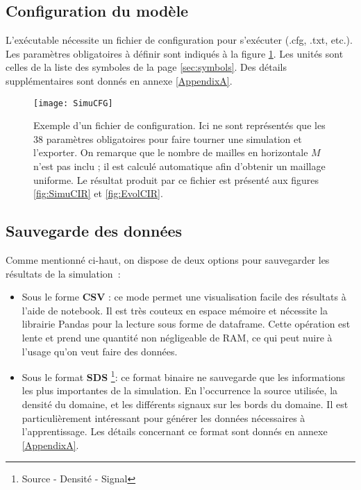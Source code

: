 \subsection{Configuration du modèle}

L'exécutable nécessite un fichier de configuration pour s'exécuter (.cfg, .txt, etc.). Les paramètres obligatoires à définir sont indiqués à la figure \ref{fig:SimuCFG}. Les unités sont celles de la liste des symboles de la page \ref{sec:symbols}. Des détails supplémentaires sont donnés en annexe \ref{AppendixA}.

\begin{figure}[!h]
\centering
\texttt{[image: SimuCFG]} 
\decoRule
\caption[SimuCFG]{Exemple d'un fichier de configuration. Ici ne sont représentés que les 38 paramètres obligatoires pour faire tourner une simulation et l'exporter. On remarque que le nombre de mailles en horizontale $M$ n'est pas inclu ; il est calculé automatique afin d'obtenir un maillage uniforme. Le résultat produit par ce fichier est présenté aux figures \ref{fig:SimuCIR} et \ref{fig:EvolCIR}.}
\label{fig:SimuCFG}
\end{figure}

\subsection{Sauvegarde des données}

Comme mentionné ci-haut, on dispose de deux options pour sauvegarder les résultats de la simulation :

\begin{itemize}
 \item Sous le forme \textbf{CSV} : ce mode permet une visualisation facile des résultats à l'aide de notebook. Il est très couteux en espace mémoire et nécessite la librairie Pandas pour la lecture sous forme de dataframe. Cette opération est lente et prend une quantité non négligeable de RAM, ce qui peut nuire à l'usage qu'on veut faire des données.
 
 \item Sous le format \textbf{SDS} \footnote{Source - Densité - Signal}: ce format binaire ne sauvegarde que les informations les plus importantes de la simulation. En l'occurrence la source utilisée, la densité du domaine, et les différents signaux sur les bords du domaine. Il est particulièrement intéressant pour générer les données nécessaires à l'apprentissage. Les détails concernant ce format sont donnés en annexe \ref{AppendixA}.
\end{itemize}


